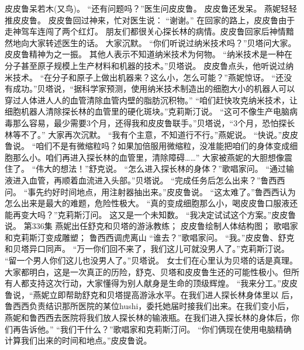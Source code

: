\documentclass[a4paper,12pt,UTF8,twoside]{ctexbook}
\begin{document}
        皮皮鲁呆若木(又鸟)。        
        “还有问题吗？”医生问皮皮鲁。  
        皮皮鲁还发呆。  
        燕妮轻轻推皮皮鲁。  
        皮皮鲁回过神来，忙对医生说：  
        “谢谢。”  
        在回家的路上，皮皮鲁由于走神驾车连闯了两个红灯。  
        朋友们都很关心探长林的病情。皮皮鲁回家后神情黯然地向大家转述医生的话。  
        大家沉默。  
        “你们听说过纳米技术吗？”贝塔问大家。  
        皮皮鲁精神为之一振。  
        其他人表示不知道纳米技术为何物。  
        “纳米技术是一种在分子甚至原子规模上生产材料和机器的技术。”贝塔说。  
        皮皮鲁点头，他听说过纳米技术。  
        “在分子和原子上做出机器来？这么小，怎么可能？”燕妮惊讶。  
        “还没有成功。”贝塔说，“据科学家预测，使用纳米技术制造出的细胞大小的机器人可以穿过人体进人人的血管清除血管内壁的脂肪沉积物。”  
        “咱们赶快攻克纳米技术，让细胞机器人清除探长林的血管里的硬化斑块。”克莉斯汀说。  
        “这可不像生产电脑病毒那么容易，最少需要3个月，还得我和皮皮鲁联手。”贝塔说，“3个月，恐怕探长林等不了。”  
        大家再次沉默。  
        “我有个主意，不知道行不行。”燕妮说。  
        “快说。”皮皮鲁说。  
        “咱们不是有微缩粒吗？如果加倍服用微缩粒，没准能把咱们的身体变成细胞那么小。咱们再进入探长林的血管里，清除障碍……”  
        大家被燕妮的大胆想像震住了。  
        “伟大的想法！”舒克说。  
        “怎么进入探长林的身体？”歌唱家问。  
        “通过输液进入血管，再顺着血流进入头部。”贝塔说。  
        “完成任务后怎么出来？”鲁西西问。  
        “事先约好时间地点，用注射器抽出来。”皮皮鲁说。  
        “这太难了。”鲁西西认为怎么出来是最大的难题，危险性极大。  
        “真的变成细胞那么小，喝皮皮鲁口服液还能再变大吗？”克莉斯汀问。  
        这又是一个未知数。  
        “我决定试试这个方案。”皮皮鲁说。          第336集  
        燕妮出任舒克和贝塔的游泳教练；  
        皮皮鲁绘制人体结构图；  
        歌唱家和克莉斯汀变成雕塑；  
        鲁西西调虎离山    
        “谁去？”歌唱家问。  
        “我。”皮皮鲁、舒克和贝塔异口同声。  
        “万一你们回不来了，我们这儿可就没男人了。”克莉斯汀说。  
        “留一个男人你们这儿也没男人了。”贝塔说。  
        女士们在心里认为贝塔的话是真理。  
        大家都明白，这是一次真正的历险，舒克、贝塔和皮皮鲁生还的可能性极小。但所有人都支持这次行动，大家懂得为别人献身是生命的顶级辉煌。  
        “我来分工。”皮皮鲁说，“燕妮立即帮助舒克和贝塔提高游泳水平。在我们进人探长林身体里以        后，鲁西西负责结识那所医院的某位hushi，委托她届时接我们出来。在我们变小后，燕妮和鲁西西去医院将我们放人探长林的输液瓶。在我们进入探长林的身体后，你们再告诉他。”  
        “我们干什么？”歌唱家和克莉斯汀问。  
        “你们俩现在使用电脑精确计算我们出来的时间和地点。”皮皮鲁说。  
\end{document}
